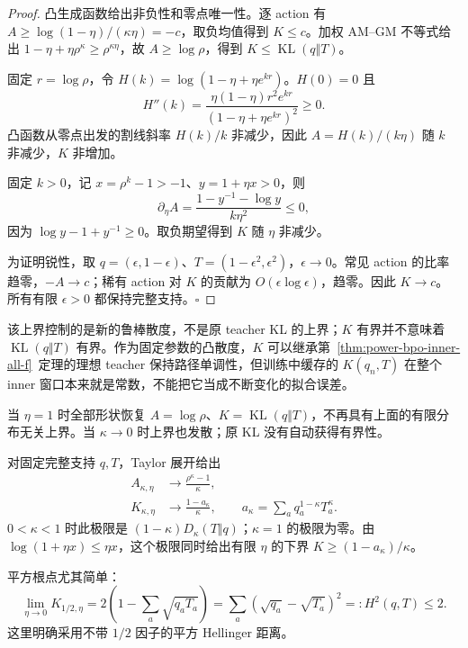 \documentclass[lang=cn,scheme=chinese,openany]{../book/elegantbook}
\newcommand{\KL}{\operatorname{KL}}
\begin{document}
\begin{proof}
凸生成函数给出非负性和零点唯一性。逐 action 有 $A\ge\log(1-\eta)/(\kappa\eta)=-c$，取负均值得到 $K\le c$。加权 AM--GM 不等式给出 $1-\eta+\eta\rho^\kappa\ge\rho^{\kappa\eta}$，故 $A\ge\log\rho$，得到 $K\le\KL(q\Vert T)$。

固定 $r=\log\rho$，令 $H(k)=\log(1-\eta+\eta e^{kr})$。$H(0)=0$ 且
\begin{equation}
 H''(k)=\frac{\eta(1-\eta)r^2e^{kr}}{(1-\eta+\eta e^{kr})^2}\ge0.
\end{equation}
凸函数从零点出发的割线斜率 $H(k)/k$ 非减少，因此 $A=H(k)/(k\eta)$ 随 $k$ 非减少，$K$ 非增加。

固定 $k>0$，记 $x=\rho^k-1>-1$、$y=1+\eta x>0$，则
\begin{equation}
 \partial_\eta A=\frac{1-y^{-1}-\log y}{k\eta^2}\le0,
\end{equation}
因为 $\log y-1+y^{-1}\ge0$。取负期望得到 $K$ 随 $\eta$ 非减少。

为证明锐性，取 $q=(\epsilon,1-\epsilon)$、$T=(1-\epsilon^2,\epsilon^2)$，$\epsilon\to0$。常见 action 的比率趋零，$-A\to c$；稀有 action 对 $K$ 的贡献为 $O(\epsilon\log\epsilon)$，趋零。因此 $K\to c$。所有有限 $\epsilon>0$ 都保持完整支持。\hfill$\square$
\end{proof}

该上界控制的是新的鲁棒散度，不是原 teacher KL 的上界；$K$ 有界并不意味着 $\KL(q\Vert T)$ 有界。作为固定参数的凸散度，$K$ 可以继承第~\ref{thm:power-bpo-inner-all-f}~定理的理想 teacher 保持路径单调性，但训练中缓存的 $K(q_n,T)$ 在整个 inner 窗口本来就是常数，不能把它当成不断变化的拟合误差。

当 $\eta=1$ 时全部形状恢复 $A=\log\rho$、$K=\KL(q\Vert T)$，不再具有上面的有限分布无关上界。当 $\kappa\to0$ 时上界也发散；原 KL 没有自动获得有界性。

对固定完整支持 $q,T$，Taylor 展开给出
\begin{align}
 A_{\kappa,\eta}&\longrightarrow\frac{\rho^\kappa-1}{\kappa},\label{eq:divergence-map-center-limit}\\
 K_{\kappa,\eta}&\longrightarrow
 \frac{1-a_\kappa}{\kappa},\qquad
 a_\kappa=\sum_aq_a^{1-\kappa}T_a^\kappa.
 \label{eq:center-small-step-limit}
\end{align}
$0<\kappa<1$ 时此极限是 $(1-\kappa)D_\kappa(T\Vert q)$；$\kappa=1$ 的极限为零。由 $\log(1+\eta x)\le\eta x$，这个极限同时给出有限 $\eta$ 的下界 $K\ge(1-a_\kappa)/\kappa$。

平方根点尤其简单：
\begin{equation}
 \lim_{\eta\to0}K_{1/2,\eta}
 =2\left(1-\sum_a\sqrt{q_aT_a}\right)
 =\sum_a(\sqrt{q_a}-\sqrt{T_a})^2=:H^2(q,T)\le2.
\end{equation}
这里明确采用不带 $1/2$ 因子的平方 Hellinger 距离。
\end{document}
